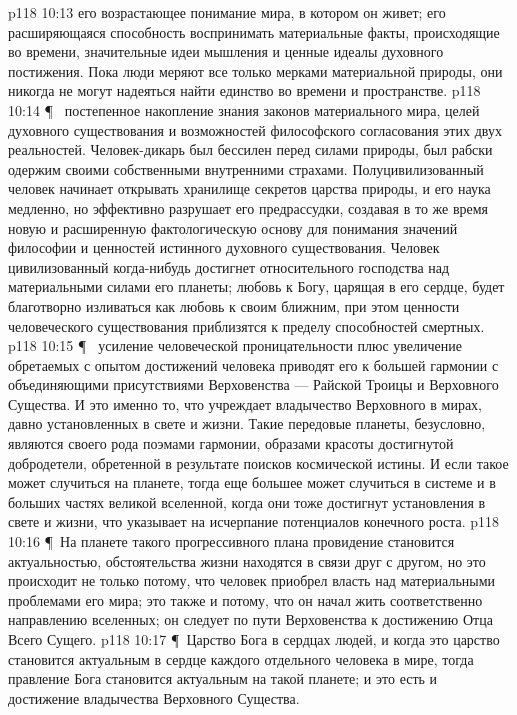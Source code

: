 \vs p118 10:13 \bibnobreakspace {} его возрастающее понимание мира, в котором он живет; его расширяющаяся способность воспринимать материальные факты, происходящие во времени, значительные идеи мышления и ценные идеалы духовного постижения. Пока люди меряют все только мерками материальной природы, они никогда не могут надеяться найти единство во времени и пространстве.
\vs p118 10:14 \P\ \bibnobreakspace {} постепенное накопление знания законов материального мира, целей духовного существования и возможностей философского согласования этих двух реальностей. Человек\hyp{}дикарь был бессилен перед силами природы, был рабски одержим своими собственными внутренними страхами. Полуцивилизованный человек начинает открывать хранилище секретов царства природы, и его наука медленно, но эффективно разрушает его предрассудки, создавая в то же время новую и расширенную фактологическую основу для понимания значений философии и ценностей истинного духовного существования. Человек цивилизованный когда\hyp{}нибудь достигнет относительного господства над материальными силами его планеты; любовь к Богу, царящая в его сердце, будет благотворно изливаться как любовь к своим ближним, при этом ценности человеческого существования приблизятся к пределу способностей смертных.
\vs p118 10:15 \P\ \bibnobreakspace {} усиление человеческой проницательности плюс увеличение обретаемых с опытом достижений человека приводят его к большей гармонии с объединяющими присутствиями Верховенства --- Райской Троицы и Верховного Существа. И это именно то, что учреждает владычество Верховного в мирах, давно установленных в свете и жизни. Такие передовые планеты, безусловно, являются своего рода поэмами гармонии, образами красоты достигнутой добродетели, обретенной в результате поисков космической истины. И если такое может случиться на планете, тогда еще большее может случиться в системе и в больших частях великой вселенной, когда они тоже достигнут установления в свете и жизни, что указывает на исчерпание потенциалов конечного роста.
\vs p118 10:16 \P\ На планете такого прогрессивного плана провидение становится актуальностью, обстоятельства жизни находятся в связи друг с другом, но это происходит не только потому, что человек приобрел власть над материальными проблемами его мира; это также и потому, что он начал жить соответственно направлению вселенных; он следует по пути Верховенства к достижению Отца Всего Сущего.
\vs p118 10:17 \P\ Царство Бога в сердцах людей, и когда это царство становится актуальным в сердце каждого отдельного человека в мире, тогда правление Бога становится актуальным на такой планете; и это есть и достижение владычества Верховного Существа.
